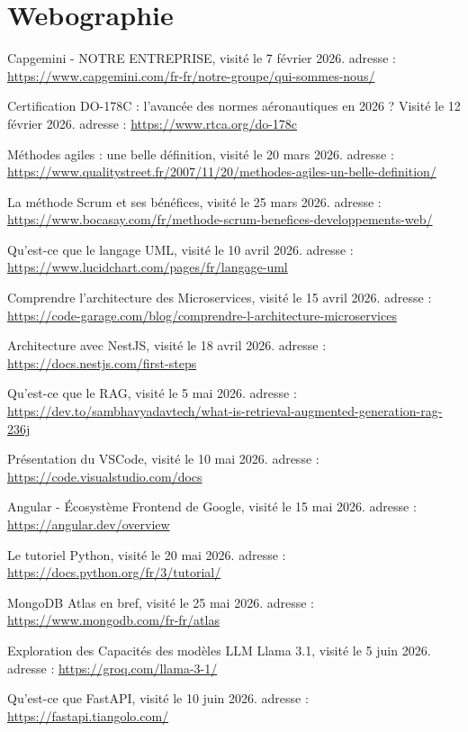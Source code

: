 \chapter*{Webographie}

\begin{enumerate}[label={[\arabic*]}, leftmargin=0.8cm, itemsep=0.3cm]
  \item \og Capgemini - NOTRE ENTREPRISE, \fg{} visit\'e le 7 f\'evrier 2026. adresse : \url{https://www.capgemini.com/fr-fr/notre-groupe/qui-sommes-nous/}
  \item \og Certification DO-178C : l'avanc\'ee des normes a\'eronautiques en 2026 ? \fg{} Visit\'e le 12 f\'evrier 2026. adresse : \url{https://www.rtca.org/do-178c}
  \item \og M\'ethodes agiles : une belle d\'efinition, \fg{} visit\'e le 20 mars 2026. adresse : \url{https://www.qualitystreet.fr/2007/11/20/methodes-agiles-un-belle-definition/}
  \item \og La m\'ethode Scrum et ses b\'en\'efices, \fg{} visit\'e le 25 mars 2026. adresse : \url{https://www.bocasay.com/fr/methode-scrum-benefices-developpements-web/}
  \item \og Qu'est-ce que le langage UML, \fg{} visit\'e le 10 avril 2026. adresse : \url{https://www.lucidchart.com/pages/fr/langage-uml}
  \item \og Comprendre l'architecture des Microservices, \fg{} visit\'e le 15 avril 2026. adresse : \url{https://code-garage.com/blog/comprendre-l-architecture-microservices}
  \item \og Architecture avec NestJS, \fg{} visit\'e le 18 avril 2026. adresse : \url{https://docs.nestjs.com/first-steps}
  \item \og Qu'est-ce que le RAG, \fg{} visit\'e le 5 mai 2026. adresse : \url{https://dev.to/sambhavyadavtech/what-is-retrieval-augmented-generation-rag-236j}
  \item \og Pr\'esentation du VSCode, \fg{} visit\'e le 10 mai 2026. adresse : \url{https://code.visualstudio.com/docs}
  \item \og Angular - \'Ecosyst\`eme Frontend de Google, \fg{} visit\'e le 15 mai 2026. adresse : \url{https://angular.dev/overview}
  \item \og Le tutoriel Python, \fg{} visit\'e le 20 mai 2026. adresse : \url{https://docs.python.org/fr/3/tutorial/}
  \item \og MongoDB Atlas en bref, \fg{} visit\'e le 25 mai 2026. adresse : \url{https://www.mongodb.com/fr-fr/atlas}
  \item \og Exploration des Capacit\'es des mod\`eles LLM Llama 3.1, \fg{} visit\'e le 5 juin 2026. adresse : \url{https://groq.com/llama-3-1/}
  \item \og Qu'est-ce que FastAPI, \fg{} visit\'e le 10 juin 2026. adresse : \url{https://fastapi.tiangolo.com/}
\end{enumerate}

